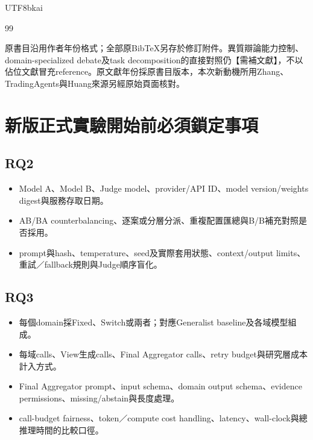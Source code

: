 \documentclass[12pt,a4paper]{article}
\begin{document}
\begin{CJK}{UTF8}{bkai}
\begin{thebibliography}{99}
\end{thebibliography}

\noindent 原書目沿用作者年份格式；全部原BibTeX另存於修訂附件。異質辯論能力控制、domain-specialized debate及task decomposition的直接對照仍【需補文獻】，不以佔位文獻冒充reference。原文獻年份採原書目版本，本次新動機所用Zhang、TradingAgents與Huang來源另經原始頁面核對。
\clearpage
\section*{新版正式實驗開始前必須鎖定事項}
\subsection*{RQ2}
\begin{itemize}
\item Model A、Model B、Judge model、provider/API ID、model version/weights digest與服務存取日期。
\item AB/BA counterbalancing、逐案或分層分派、重複配置匯總與B/B補充對照是否採用。
\item prompt與hash、temperature、seed及實際套用狀態、context/output limits、重試／fallback規則與Judge順序盲化。
\end{itemize}
\subsection*{RQ3}
\begin{itemize}
\item 每個domain採Fixed、Switch或兩者；對應Generalist baseline及各域模型組成。
\item 每域calls、View生成calls、Final Aggregator calls、retry budget與研究層成本計入方式。
\item Final Aggregator prompt、input schema、domain output schema、evidence permissions、missing/abstain與長度處理。
\item call-budget fairness、token／compute cost handling、latency、wall-clock與總推理時間的比較口徑。
\end{itemize}

\end{CJK}
\end{document}
